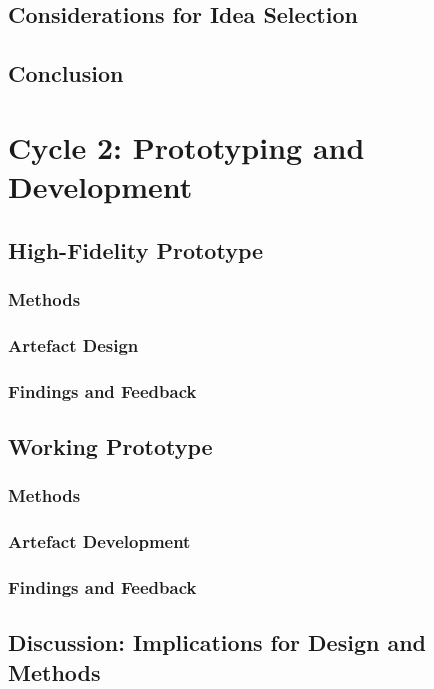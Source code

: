 \documentclass[12pt,a4paper,oneside]{report}
\begin{document}
\section{Considerations for Idea Selection}

\section{Conclusion}


\chapter{Cycle 2: Prototyping and Development}

\section{High-Fidelity Prototype}
\subsection{Methods}
\subsection{Artefact Design}
\subsection{Findings and Feedback}

\section{Working Prototype}
\subsection{Methods}
\subsection{Artefact Development}
\subsection{Findings and Feedback}

\section{Discussion: Implications for Design and Methods}
\end{document}
